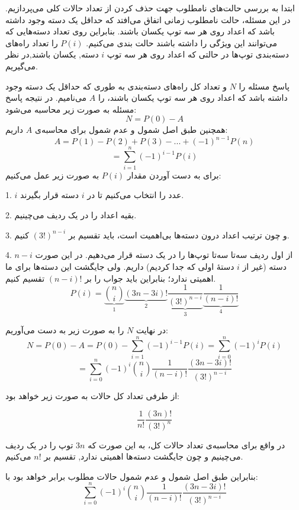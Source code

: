     \p
ابتدا به بررسی حالت‌های نامطلوب جهت حذف کردن از تعداد حالات کلی می‌پردازیم. در این مسئله، حالت نامطلوب زمانی اتفاق می‌افتد که حداقل یک دسته‌ وجود داشته باشد که اعداد روی هر سه توپ یکسان باشند. بنابراین روی تعداد دسته‌هایی که می‌توانند این ویژگی را داشته باشند حالت بندی می‌کنیم.
$P(i)$
را تعداد راه‌های دسته‌بندی توپ‌ها 
در حالتی که
اعداد روی هر سه توپ 
   $i$
دسته, یکسان باشند,در نظر می‌گیریم.

 پاسخ مسئله 
را $N$
و تعداد کل راه‌های دسته‌بندی
به طوری که حداقل یک دسته‌ وجود داشته باشد که اعداد روی هر سه توپ یکسان باشند، 
 را
 $A$ 
 می‌نامیم. در نتیجه پاسخ مسئله به صورت زیر محاسبه‌ می‌شود:
$$N = P(0) - A$$
همچنین طبق اصل شمول و عدم شمول برای محاسبه‌ی 
$A$
داریم:
$$A = P(1) - P(2) + P(3) - ... + (-1)^{n-1}P(n)$$
$$= \sum\limits_{i = 1}^n (-1)^{i-1} P(i)$$
برای به دست آوردن مقدار 
$P(i)$
به صورت زیر عمل می‌کنیم:

	    1.
    	$i$
    	 عدد را انتخاب می‌کنیم تا در 
    	 $i$
    	  دسته قرار بگیرند.
    	
		 2.
        بقیه اعداد را در یک ردیف می‌چینیم.
    	
		 3.
    	 و چون ترتیب اعداد درون دسته‌ها بی‌اهمیت است، باید تقسیم بر $(3!)^{n-i}$ کنیم.
    	
		 4.
    	 از اول ردیف سه‌تا سه‌تا توپ‌ها را در یک دسته قرار می‌دهیم. در این صورت $n - i$ دسته (غیر از 
    	$i$ 
    	دستهٔ اولی که جدا کردیم) داریم. ولی جایگشت این دسته‌ها برای ما اهمیتی ندارد؛ بنابراین باید جواب را بر $(n-i)!$ تقسیم کنیم.
    	$$P(i) = \underbrace{{n  \choose i}}_1\underbrace{(3n - 3i)!}_2\underbrace{\frac{1}{(3!)^{n - i}}}_3 \underbrace{\frac{1}{(n - i)!}}_4$$


    در نهایت $N$ 
    را به صورت زیر به دست می‌آوریم:
	$$N = P(0) - A = P(0) - \sum\limits_{i = 1}^n (-1)^{i-1} P(i) = \sum\limits_{i = 0}^n (-1)^{i} P(i)$$
	$$= \sum\limits_{i = 0}^n (-1)^i {n \choose i} \frac{1}{(n - i)!} \frac{(3n - 3i)!}{(3!)^{n - i}}$$

    \p
	از طرفی تعداد کل حالات به صورت زیر خواهد بود:
	
	$$\frac{1}{n!} \frac{(3n)!}{(3!)^n}$$
	
	در واقع برای محاسبه‌ی تعداد حالات کل، به این صورت که $3n$ توپ را در یک ردیف می‌چینیم و چون جایگشت دسته‌ها اهمیتی ندارد, تقسیم بر $n!$ می‌کنیم.
	
    \p
	بنابراین طبق اصل شمول و عدم شمول حالات مطلوب برابر خواهد بود با:
	$$\sum\limits_{i = 0}^n (-1)^i {n \choose i} \frac{1}{(n - i)!} \frac{(3n - 3i)!}{(3!)^{n - i}}$$
